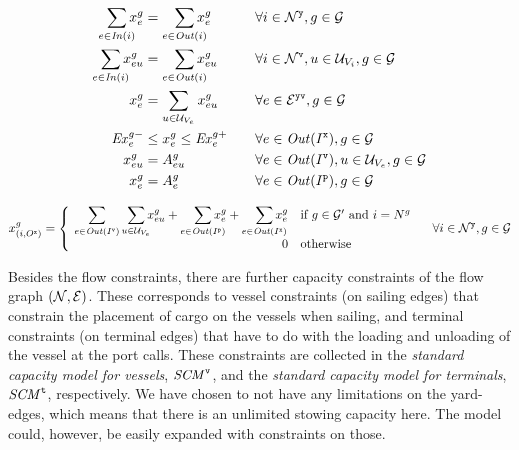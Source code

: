 \begin{alignat}{5}    
\label{OnOff}
\so[r]{\sum_{e\in \mi{In}(i)}} x^{g}_{e}	&= \so[r]{\sum_{e\in \mi{Out}(i)}}x^{g}_{e} &&\forall i\in \mc{N}^\ttt{y}, g\in \mc{G}\\
%
\label{secOnOff}
\so[r]{\sum_{e\in \mi{In}(i)}} x^{g}_{eu}	&= \so[r]{\sum_{e\in \mi{Out}(i)}}x^{g}_{eu}&& \forall i\in \mc{N}^\ttt{v}, u\in \mc{U}_{V_i}, g\in \mc{G} \\
%
\label{sumVars1}
x^g_{e} 																	&= \sum_{u\in \mc{U}_{V_e}} x^{g}_{eu}			&& \forall e\in \mc{E}^\ttt{yv}, g\in\mc{G}\\
%
\label{exportLimits} \mi{Ex}^{g-}_e				&\leq x^g_{e}\leq \mi{Ex}^{g+}_e\quad				&& \forall e\in \mi{Out}(I^\ttt{x}), g\in \mc{G} \\
\label{onboard} 			x^{g}_{eu} 					&= A^{g}_{eu}																&& \forall e\in\mi{Out}(I^\ttt{v}), u\in \mc{U}_{V_e}, g\in \mc{G}\\
\label{sourceYard} 		x^g_{e} 						&= A^g_{e}																	&& \forall e\in \mi{Out}(I^\ttt{p}), g\in \mc{G}
\end{alignat}

\begin{equation}\label{sinks}
x^g_{(i,O^\ttt{x})} = 
\left\{\begin{array}{rl}
		\quad\so[l]{\sum_{e\in\mi{Out}(I^\ttt{v})}}\so[r]{\sum_{u\in\mc{U}_{V_e}}} x^g_{eu} + \so[r]{\sum_{e\in \mi{Out}(I^\ttt{p})}} x^g_e + \so[r]{\sum_{e\in \mi{Out}(I^\ttt{x})}} x^g_{e}							 							 & \text{if } g\in \mc{G}' \text{ and } i = N^g\\
													0	& \text{otherwise}\end{array}\right.				
\quad \forall i\in \mc{N}^\ttt{y}, g\in\mc{G}
\end{equation}

Besides the flow constraints, there are further capacity constraints of the flow graph $(\mathcal{N},\mathcal{E})$. These corresponds to vessel constraints (on sailing edges) that constrain the placement of cargo on the vessels when sailing, and terminal constraints (on terminal edges) that have to do with the loading and unloading of the vessel at the port calls. These constraints are collected in the \emph{standard capacity model for vessels}, $\mathit{SCM}^\texttt{v}$, and the \emph{standard capacity model for terminals}, $\mathit{SCM}^\texttt{t}$, respectively. We have chosen to not have any limitations on the yard-edges, which means that there is an unlimited stowing capacity here. The model could, however, be easily expanded with constraints on those. 

